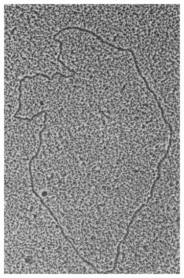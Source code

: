 \documentclass[12pt,twoside]{reedthesis}
\begin{document}
\begin{figure}[t!]
     \begin{center}
     \begin{subfigure}[t]{.4\textwidth}
        \centering
        \includegraphics[width=0.9\linewidth]{../figures/mtdna_nass_1966.jpg}
        \label{mtdna:tem}
    \end{subfigure}%
    \begin{subfigure}[t]{.6\textwidth}
        \centering

\end{subfigure}
\end{center}
\end{figure}
\end{document}
